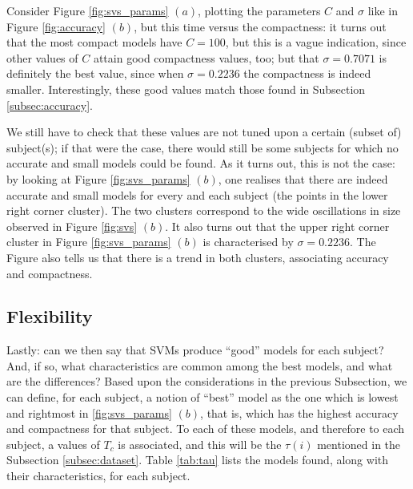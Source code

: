 \documentclass[a4paper,10pt,conference]{ieeeconf}
\begin{document}
Consider Figure \ref{fig:svs_params} $(a)$, plotting the parameters
$C$ and $\sigma$ like in Figure \ref{fig:accuracy} $(b)$, but this
time versus the compactness: it turns out that the most compact models
have $C=100$, but this is a vague indication, since other values of
$C$ attain good compactness values, too; but that $\sigma=0.7071$ is
definitely the best value, since when $\sigma=0.2236$ the compactness
is indeed smaller. Interestingly, these good values match those found
in Subsection \ref{subsec:accuracy}.

We still have to check that these values are not tuned upon a certain
(subset of) subject(s); if that were the case, there would still be
some subjects for which no accurate and small models could be
found. As it turns out, this is not the case: by looking at Figure
\ref{fig:svs_params} $(b)$, one realises that there are indeed
accurate and small models for every and each subject (the points in
the lower right corner cluster). The two clusters correspond to the
wide oscillations in size observed in Figure \ref{fig:svs} $(b)$. It
also turns out that the upper right corner cluster in Figure
\ref{fig:svs_params} $(b)$ is characterised by $\sigma=0.2236$. The
Figure also tells us that there is a trend in both clusters,
associating accuracy and compactness.

\subsection{Flexibility}

Lastly: can we then say that SVMs produce ``good'' models for each
subject? And, if so, what characteristics are common among the best
models, and what are the differences? Based upon the considerations in
the previous Subsection, we can define, for each subject, a notion of
``best'' model as the one which is lowest and rightmost in
\ref{fig:svs_params} $(b)$, that is, which has the highest accuracy
and compactness for that subject. To each of these models, and
therefore to each subject, a values of $T_c$ is associated, and this
will be the $\tau(i)$ mentioned in the Subsection
\ref{subsec:dataset}. Table \ref{tab:tau} lists the models found,
along with their characteristics, for each subject.
\end{document}
